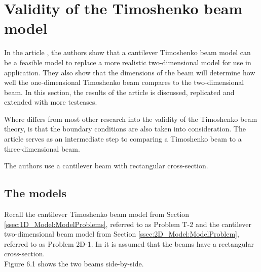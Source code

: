 \documentclass[../../main.tex]{subfiles}
\begin{document}
\section{Validity of the Timoshenko beam model}
In the article \cite{LVV09}, the authors show that a cantilever Timoshenko beam model can be a feasible model to replace a more realistic two-dimensional model for use in application. They also show that the dimensions of the beam will determine how well the one-dimensional Timoshenko beam compares to the two-dimensional beam. In this section, the results of the article is discussed, replicated and extended with more testcases.

Where \cite{LVV09} differs from most other research into the validity of the Timoshenko beam theory, is that the boundary conditions are also taken into consideration. The article serves as an intermediate step to comparing a Timoshenko beam to a three-dimensional beam.

The authors use a cantilever beam with rectangular cross-section.


\subsection{The models}
Recall the cantilever Timoshenko beam model from Section \ref{ssec:1D_Model:ModelProblems}, referred to as Problem T-2 and the cantilever two-dimensional beam model from Section \ref{ssec:2D_Model:ModelProblem}, referred to as Problem 2D-1. In \cite{LVV09} it is assumed that the beams have a rectangular cross-section.\\

Figure 6.1 shows the two beams side-by-side.
\end{document}

